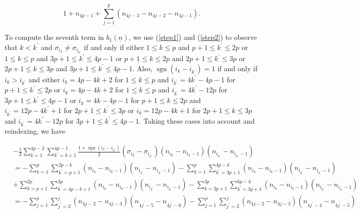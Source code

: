 \documentclass[11pt,reqno]{amsart}
\theoremstyle{definition}
\numberwithin{equation}{section}
\newcommand{\sgn}{\operatorname{sgn}}
\begin{document}
\begin{equation} \label{sixb1b2}
1 + n_{4p-1}  + \sum_{j=1}^{p} (n_{4j-3} - n_{4j-2} - n_{4j-1}).
\end{equation}

\noindent To compute the seventh term in $b_1({\underline{n}})$, we use (\ref{step1}) and (\ref{step2}) to observe that $k < k^{\prime}$ and $\sigma_{i_k} \neq \sigma_{i_{k^{\prime}}}$ if and only if either $1 \leq k \leq p$ and $p+1 \leq k^{\prime} \leq 2p$ or $1 \leq k \leq p$ and $3p+1 \leq k^{\prime} \leq 4p-1$ or 
$p+1 \leq k \leq 2p$ and $2p+1 \leq k^{\prime} \leq 3p$ or $2p+1 \leq k \leq 3p$ and $3p+1 \leq k^{\prime} \leq 4p-1$.  Also, $\sgn(i_k - i_{k^{\prime}}) = 1$ if and only if $i_k > i_{k^{\prime}}$ and either $i_k = 4p-4k+2$ for $1 \leq k \leq p$ and $i_{k^{\prime}} = 4k^{\prime} - 4p - 1$ for $p+1 \leq k^{\prime} \leq 2p$ or $i_k = 4p-4k+2$ for $1 \leq k \leq p$ and $i_{k^{\prime}} = 4k^{\prime} -12p$ for $3p+1 \leq k^{\prime} \leq 4p-1$ or $i_k = 4k-4p-1$ for $p+1 \leq k \leq 2p$ and $i_{k^{\prime}} = 12p - 4k^{\prime} + 1$ for $2p+1 \leq k^{\prime} \leq 3p$ or $i_k = 12p - 4k + 1$ for $2p+1 \leq k \leq 3p$ and $i_{k^{\prime}} = 4k^{\prime} - 12p$ for $3p+1 \leq k^{\prime} \leq 4p-1$. Taking these cases into account and reindexing, we have

\begin{equation*}
\begin{aligned}
& - \frac{1}{2} \sum_{k=1}^{4p-2} \sum_{k^{\prime} = k+1}^{4p-1} \frac{1 + \sgn(i_k - i_{k^{\prime}})}{2}(\sigma_{i_k} - \sigma_{i_{k^{\prime}}})(n_{i_k} - n_{i_k - 1})(n_{i_{k^{\prime}}} - n_{i_{k^{\prime}} - 1}) \\
& = - \sum_{k=1}^{p} \sum_{k^{\prime} = p+1}^{2p-k} (n_{i_k} - n_{i_k - 1})(n_{i_{k^{\prime}}} - n_{i_{k^{\prime}} - 1}) - \sum_{k=1}^{p} \sum_{k^{\prime}=3p+1}^{4p-k} (n_{i_k} - n_{i_k - 1})(n_{i_{k^{\prime}}} - n_{i_{k^{\prime}} - 1}) \\
& + \sum_{k=p+1}^{2p} \sum_{k^{\prime} = 4p-k+1}^{3p} (n_{i_k} - n_{i_k - 1})(n_{i_{k^{\prime}}} - n_{i_{k^{\prime}} - 1}) - \sum_{k=2p+1}^{3p} \sum_{k^{\prime} = 3p+1}^{6p-k} (n_{i_k} - n_{i_k - 1})(n_{i_{k^{\prime}}} - n_{i_{k^{\prime}} - 1}) \\
& = - \sum_{j=1}^{p} \sum_{j^{\prime}=2}^{j} (n_{4j-2} - n_{4j-3})(n_{4j^{\prime} - 5} - n_{4j^{\prime} - 6}) - \sum_{j=1}^{p} \sum_{j^{\prime}=2}^{j} (n_{4j-2} - n_{4j-3})(n_{4j^{\prime} -4} - n_{4j^{\prime} - 5}) \\
\end{aligned}
\end{equation*}
\end{document}
